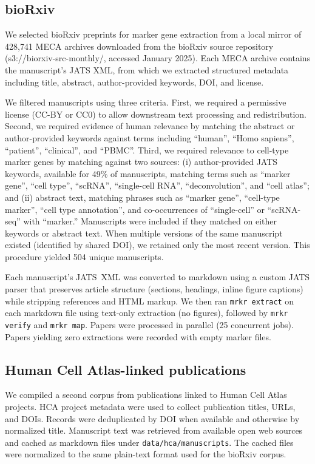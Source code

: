\documentclass[10pt,twocolumn]{article}
\theoremstyle{plain}
\theoremstyle{definition}
\theoremstyle{remark}
\begin{document}
\subsection{bioRxiv}

We selected bioRxiv preprints for marker gene extraction from a local mirror of 428,741 MECA archives downloaded from the bioRxiv source repository (s3://biorxiv-src-monthly/, accessed January 2025). Each MECA archive contains the manuscript's JATS XML, from which we extracted structured metadata including title, abstract, author-provided keywords, DOI, and license.

We filtered manuscripts using three criteria. First, we required a permissive license (CC-BY or CC0) to allow downstream text processing and redistribution. Second, we required evidence of human relevance by matching the abstract or author-provided keywords against terms including ``human'', ``Homo sapiens'', ``patient'', ``clinical'', and ``PBMC''. Third, we required relevance to cell-type marker genes by matching against two sources: (i) author-provided JATS keywords, available for 49\% of manuscripts, matching terms such as ``marker gene'', ``cell type'', ``scRNA'', ``single-cell RNA'', ``deconvolution'', and ``cell atlas''; and (ii) abstract text, matching phrases such as ``marker gene'', ``cell-type marker'', ``cell type annotation'', and co-occurrences of ``single-cell'' or ``scRNA-seq'' with ``marker.'' Manuscripts were included if they matched on either keywords or abstract text. When multiple versions of the same manuscript existed (identified by shared DOI), we retained only the most recent version. This procedure yielded 504 unique manuscripts.

Each manuscript's JATS~XML was converted to markdown using a custom JATS parser that preserves article structure (sections, headings, inline figure captions) while stripping references and HTML markup. We then ran \texttt{mrkr extract} on each markdown file using text-only extraction (no figures), followed by \texttt{mrkr verify} and \texttt{mrkr map}. Papers were processed in parallel (25 concurrent jobs). Papers yielding zero extractions were recorded with empty marker files.

\subsection{Human Cell Atlas-linked publications}

We compiled a second corpus from publications linked to Human Cell Atlas projects. HCA project metadata were used to collect publication titles, URLs, and DOIs. Records were deduplicated by DOI when available and otherwise by normalized title. Manuscript text was retrieved from available open web sources and cached as markdown files under \texttt{data/hca/manuscripts}. The cached files were normalized to the same plain-text format used for the bioRxiv corpus.
\end{document}
